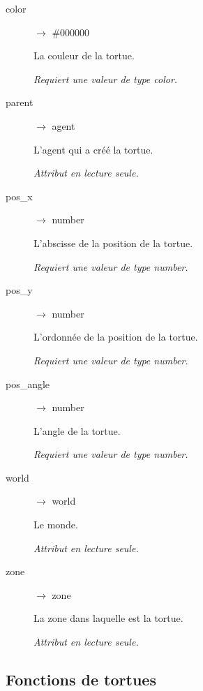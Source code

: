 \begin{description}
	\item[color] $\rightarrow$ \#000000

	La couleur de la tortue.

	\emph{Requiert une valeur de type color.}

	\item[parent] $\rightarrow$ agent

	L'agent qui a créé la tortue.

	\emph{Attribut en lecture seule.}

	\item[pos\_x] $\rightarrow$ number

	L'abscisse de la position de la tortue.

	\emph{Requiert une valeur de type number.}

	\item[pos\_y] $\rightarrow$ number

	L'ordonnée de la position de la tortue.

	\emph{Requiert une valeur de type number.}

	\item[pos\_angle] $\rightarrow$ number

	L'angle de la tortue.

	\emph{Requiert une valeur de type number.}

	\item[world] $\rightarrow$ world

	Le monde.

	\emph{Attribut en lecture seule.}

	\item[zone] $\rightarrow$ zone

	La zone dans laquelle est la tortue.

	\emph{Attribut en lecture seule.}
\end{description}

\subsection{Fonctions de tortues}

